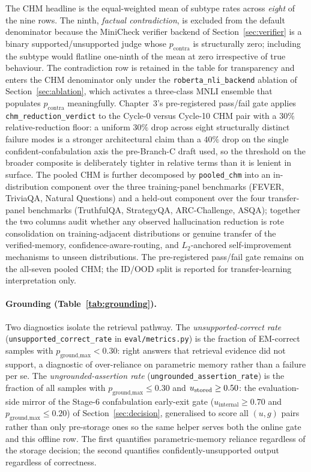 The CHM headline is the equal-weighted mean of subtype rates across \emph{eight} of the nine rows. The ninth, \emph{factual contradiction}, is excluded from the default denominator because the MiniCheck verifier backend of Section~\ref{sec:verifier} is a binary supported/unsupported judge whose $p_{\text{contra}}$ is structurally zero; including the subtype would flatline one-ninth of the mean at zero irrespective of true behaviour. The contradiction row is retained in the table for transparency and enters the CHM denominator only under the \texttt{roberta\_nli\_backend} ablation of Section~\ref{sec:ablation}, which activates a three-class MNLI ensemble that populates $p_{\text{contra}}$ meaningfully. Chapter~3's pre-registered pass/fail gate applies \texttt{chm\_reduction\_verdict} to the Cycle-0 versus Cycle-10 CHM pair with a $30\%$ relative-reduction floor: a uniform $30\%$ drop across eight structurally distinct failure modes is a stronger architectural claim than a $40\%$ drop on the single confident-confabulation axis the pre-Branch-C draft used, so the threshold on the broader composite is deliberately tighter in relative terms than it is lenient in surface. The pooled CHM is further decomposed by \texttt{pooled\_chm} into an in-distribution component over the three training-panel benchmarks (FEVER, TriviaQA, Natural Questions) and a held-out component over the four transfer-panel benchmarks (TruthfulQA, StrategyQA, ARC-Challenge, ASQA); together the two columns audit whether any observed hallucination reduction is rote consolidation on training-adjacent distributions or genuine transfer of the verified-memory, confidence-aware-routing, and $L_{2}$-anchored self-improvement mechanisms to unseen distributions. The pre-registered pass/fail gate remains on the all-seven pooled CHM; the ID/OOD split is reported for transfer-learning interpretation only.

\paragraph{Grounding (Table~\ref{tab:grounding}).}
Two diagnostics isolate the retrieval pathway. The \emph{unsupported-correct rate} (\texttt{unsupported\_correct\_rate} in \texttt{eval/metrics.py}) is the fraction of EM-correct samples with $p_{\text{ground,max}} < 0.30$: right answers that retrieval evidence did not support, a diagnostic of over-reliance on parametric memory rather than a failure per se. The \emph{ungrounded-assertion rate} (\texttt{ungrounded\_assertion\_rate}) is the fraction of all samples with $p_{\text{ground,max}} \leq 0.30$ and $u_{\text{stored}} \geq 0.50$: the evaluation-side mirror of the Stage-6 confabulation early-exit gate ($u_{\text{internal}} \geq 0.70$ and $p_{\text{ground,max}} \leq 0.20$) of Section~\ref{sec:decision}, generalised to score all $(u, g)$ pairs rather than only pre-storage ones so the same helper serves both the online gate and this offline row. The first quantifies parametric-memory reliance regardless of the storage decision; the second quantifies confidently-unsupported output regardless of correctness.


